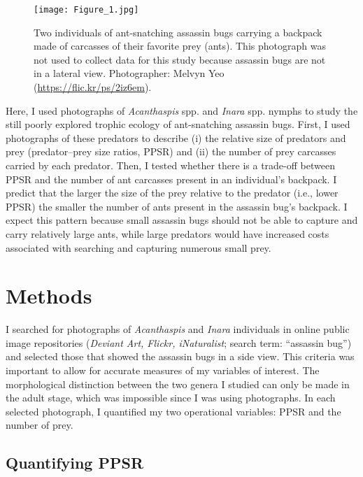 \documentclass{article}
\begin{document}
\begin{figure}
    \centering
    \texttt{[image: Figure\_1.jpg]}
    \caption{Two individuals of ant-snatching assassin bugs carrying a backpack made of carcasses of their favorite prey (ants). This photograph was not used to collect data for this study because assassin bugs are not in a lateral view. Photographer: Melvyn Yeo (\url{https://flic.kr/ps/2iz6em}).}
    \label{figure_bugs}
\end{figure}

Here, I used photographs of \textit{Acanthaspis} spp. and \textit{Inara} spp. nymphs to study the still poorly explored trophic ecology of ant-snatching assassin bugs. First, I used photographs of these predators to describe (i) the relative size of predators and prey (predator–prey size ratios, PPSR) and (ii) the number of prey carcasses carried by each predator. Then, I tested whether there is a trade-off between PPSR and the number of ant carcasses present in an individual's backpack. I predict that the larger the size of the prey relative to the predator (i.e., lower PPSR) the smaller the number of ants present in the assassin bug's backpack. I expect this pattern because small assassin bugs should not be able to capture and carry relatively large ants, while large predators would have increased costs associated with searching and capturing numerous small prey.

\section{Methods}

I searched for photographs of \textit{Acanthaspis} and \textit{Inara} individuals in online public image repositories (\textit{Deviant Art, Flickr, iNaturalist};
search term: “assassin bug”) and selected those that showed the assassin bugs in a side view. This criteria was important to allow for accurate measures of my variables of interest. The morphological distinction between the two genera I studied can only be made in the adult stage,
which was impossible since I was using photographs. In each selected photograph, I quantified my two operational variables: PPSR and the number of prey. 

\subsection{Quantifying PPSR}
\end{document}
